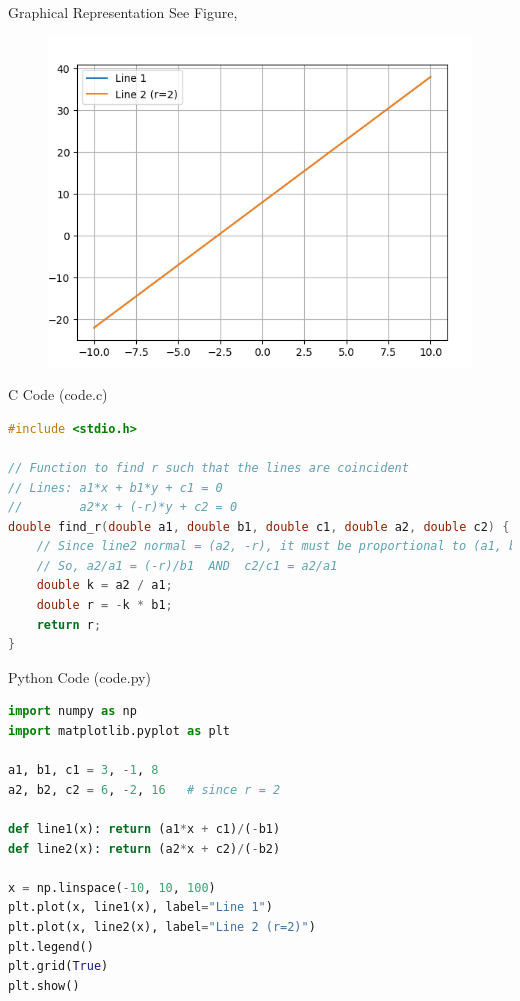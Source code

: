 \documentclass{beamer}
\begin{document}
\begin{frame}{Graphical Representation}
See Figure,
\begin{figure}[h!]
    \centering
    \includegraphics[height=0.5\textheight, keepaspectratio]{figs/fig.png}
    \label{figure_1}
\end{figure}
\end{frame}
\begin{frame}[fragile]{C Code (code.c)}
\begin{lstlisting}[language=C]
#include <stdio.h>

// Function to find r such that the lines are coincident
// Lines: a1*x + b1*y + c1 = 0
//        a2*x + (-r)*y + c2 = 0
double find_r(double a1, double b1, double c1, double a2, double c2) {
    // Since line2 normal = (a2, -r), it must be proportional to (a1, b1)
    // So, a2/a1 = (-r)/b1  AND  c2/c1 = a2/a1
    double k = a2 / a1; 
    double r = -k * b1; 
    return r;
}


\end{lstlisting}
\end{frame}

\begin{frame}[fragile]{Python Code (code.py)}
\begin{lstlisting}[language=Python]
import numpy as np
import matplotlib.pyplot as plt

a1, b1, c1 = 3, -1, 8
a2, b2, c2 = 6, -2, 16   # since r = 2

def line1(x): return (a1*x + c1)/(-b1)
def line2(x): return (a2*x + c2)/(-b2)

x = np.linspace(-10, 10, 100)
plt.plot(x, line1(x), label="Line 1")
plt.plot(x, line2(x), label="Line 2 (r=2)")
plt.legend()
plt.grid(True)
plt.show()

\end{lstlisting}
\end{frame}
\end{document}
